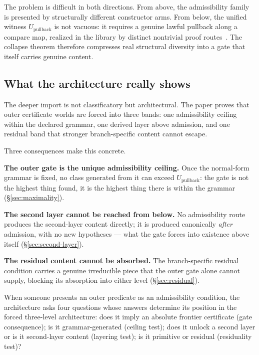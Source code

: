 \documentclass[11pt]{article}
\theoremstyle{plain}
\theoremstyle{definition}
\theoremstyle{remark}
\newcommand{\Upb}{U_{\mathrm{pullback}}}
\begin{document}
The problem is difficult in both directions.  From above, the admissibility
family is presented by structurally different constructor arms.  From below,
the unified witness $\Upb$ is not vacuous: it requires a genuine lawful
pullback along a compare map, realized in the library by distinct nontrivial
proof routes~\cite{SpivackAdequacy}.  The collapse theorem therefore compresses
real structural diversity into a gate that itself carries genuine content.

\subsection{What the architecture really shows}

The deeper import is not classificatory but architectural.  The paper proves
that outer certificate worlds are forced into three bands: one admissibility
ceiling within the declared grammar, one derived layer above admission, and
one residual band that stronger branch-specific content cannot escape.

Three consequences make this concrete.

\textbf{The outer gate is the unique admissibility ceiling.}  Once the
normal-form grammar is fixed, no class generated from it can exceed $\Upb$:
the gate is not the highest thing found, it is the highest thing there is
within the grammar (\S\ref{sec:maximality}).

\textbf{The second layer cannot be reached from below.}  No admissibility
route produces the second-layer content directly; it is produced
canonically \emph{after} admission, with no new hypotheses --- what the
gate forces into existence above itself (\S\ref{sec:second-layer}).

\textbf{The residual content cannot be absorbed.}  The branch-specific
residual condition carries a genuine irreducible piece that the outer gate
alone cannot supply, blocking its absorption into either level
(\S\ref{sec:residual}).

When someone presents an outer predicate as an admissibility condition,
the architecture asks four questions whose answers determine its position
in the forced three-level architecture: does it imply an absolute frontier
certificate (gate consequence); is it grammar-generated (ceiling test);
does it unlock a second layer or is it second-layer content (layering
test); is it primitive or residual (residuality test)?

\end{document}
